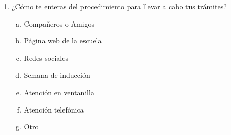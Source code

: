             \begin{multicols}{2}
        
                \begin{enumerate}
                    \item ¿Cómo te enteras del procedimiento para llevar a cabo tus trámites?
                    \begin{enumerate}[(a)]
                        \item Compañeros o Amigos
                        \item Página web de la escuela
                        \item Redes sociales
                        \item Semana de inducción
                        \item Atención en ventanilla
                        \item Atención telefónica 
                        \item Otro
                    \end{enumerate}
                

\end{enumerate}
\end{multicols}
